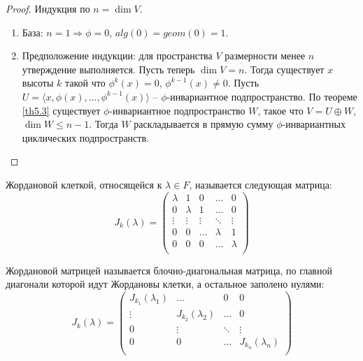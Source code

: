 \begin{proof}
    Индукция по $n = \dim V$. 
    \begin{enumerate}
        \item База: $n = 1 \Rightarrow \phi = 0$, $alg(0) = geom(0) = 1$.
        \item Предположение индукции: для пространства $V$ размерности менее $n$ утверждение выполняется. 
        Пусть теперь $\dim V = n$. 
        Тогда существует $x$ высоты $k$ такой что $\phi^k(x) = 0$, $\phi^{k-1}(x) \neq 0$. 
        Пусть $U = \langle x, \phi(x), \dots, \phi^{k-1}(x) \rangle$ -- $\phi$-инвариантное подпространство.
        По теореме \ref{th5.3} существует $\phi$-инвариантное подпространство $W$, такое что  
        $V = U \oplus W$, $\dim W \leq n-1$. Тогда $W$ раскладывается в прямую сумму 
        $\phi$-инвариантных циклических подпространств.
    \end{enumerate}
\end{proof}

\begin{definition}
    Жордановой клеткой, относящейся к  $\lambda \in F$, называется следующая матрица:
    \[J_{k}(\lambda) = \begin{pmatrix}
	\lambda      & 1      & 0      & \dots  & 0\\
		0      & \lambda      & 1      & \dots  & 0\\
		\vdots & \vdots & \vdots & \ddots & \vdots \\
        0      & 0      & \dots      & \lambda  & 1\\
        0      & 0      & 0      & \dots  & \lambda \\
	\end{pmatrix}\]
\end{definition}

\begin{definition}
    Жордановой матрицей называется блочно-диагональная матрица, по главной диагонали которой идут 
    Жордановы клетки, а остальное заполено нулями:
    \[J_{k}(\lambda) = \begin{pmatrix}
        J_{k_1}(\lambda_1)      & \dots      & 0    & 0 \\
        \vdots      & J_{k_2}(\lambda_2)      & \dots   & 0 \\
        0   & \vdots     & \ddots    & \vdots \\
        0      & 0      & \dots    & J_{k_n}(\lambda_n) \\
        \end{pmatrix}\]
\end{definition}

